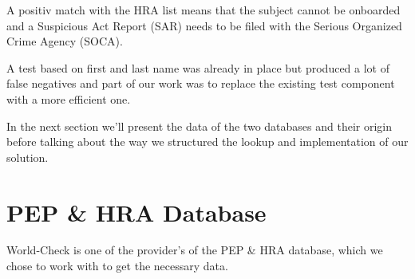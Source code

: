 \documentclass[a4paper, oneside]{csthesis}
\begin{document}
A positiv match with the HRA list means that the subject cannot be onboarded and a Suspicious Act Report (SAR) needs to be filed with the Serious Organized Crime Agency (SOCA).

A test based on first and last name was already in place but produced a lot of false negatives and part of our work was to replace the existing test component with a more efficient one.

In the next section we'll present the data of the two databases and their origin before talking about the way we structured the lookup and implementation of our solution.












\section{PEP \& HRA Database}


World-Check \cite{website:world-check} is one of the provider's of the PEP \& HRA database, which we chose to work with to get the necessary data.
\end{document}
